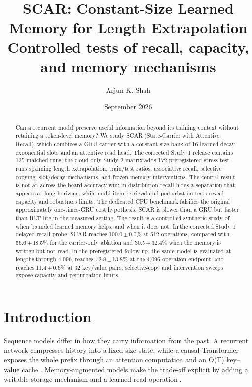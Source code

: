 \documentclass{article}
\title{SCAR: Constant-Size Learned Memory for Length Extrapolation\\
\large Controlled tests of recall, capacity, and memory mechanisms}
\author{Arjun K. Shah}
\date{September 2026}
\begin{document}
\maketitle

\begin{abstract}
Can a recurrent model preserve useful information beyond its training context
without retaining a token-level memory? We study SCAR (State-Carrier with
Attentive Recall), which combines a GRU carrier with a constant-size bank of
16 learned-decay exponential slots and an attentive read head. The
corrected Study 1 release contains 135 matched runs; the cloud-only
Study 2 matrix adds 172 preregistered stress-test runs spanning
length extrapolation, train/test ratios, associative recall, selective copying,
slot/decay mechanisms, and frozen-memory interventions. The central result is
not an across-the-board accuracy win: in-distribution recall hides a separation
that appears at long horizons, while multi-item retrieval and perturbation
tests reveal capacity and robustness limits. The dedicated CPU benchmark
falsifies the original approximately one-times-GRU cost hypothesis: SCAR is
slower than a GRU but faster than RLT-lite in the measured setting. The result
is a controlled synthetic study of when bounded learned memory helps, and when
it does not.
In the corrected Study 1 delayed-recall probe, SCAR reaches 100.0\,$\pm$\,0.0\% at 512 operations, compared with 56.6\,$\pm$\,18.5\% for the carrier-only ablation and 30.5\,$\pm$\,32.4\% when the memory is written but not read. In the preregistered follow-up, the same model is evaluated at lengths through 4,096, reaches 72.8\,$\pm$\,13.8\% at the 4,096-operation endpoint, and reaches 11.4\,$\pm$\,0.6\% at 32 key/value pairs; selective-copy and intervention sweeps expose capacity and perturbation limits.
\end{abstract}

\section{Introduction}
Sequence models differ in how they carry information from the past. A
recurrent network compresses history into a fixed-size state, while a causal
Transformer exposes the whole prefix through an attention computation and an
O(T) key--value cache \cite{elman1990,hochreiter1997,cho2014,vaswani2017}.
Memory-augmented models make the trade-off explicit by adding a writable
storage mechanism and a learned read operation \cite{sukhbaatar2015}.
\end{document}
